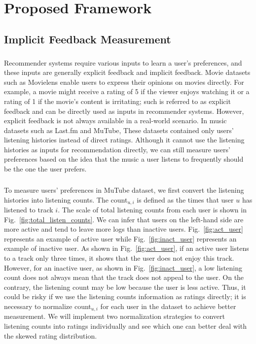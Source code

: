 \documentclass[a4paper,12pt]{report}
\begin{document}
\chapter{Proposed Framework}
\section{Implicit Feedback Measurement}
\label{section:Implicit Feedback Measurment}
\paragraph{}
Recommender systems require various inputs to learn a user's preferences, and these inputs are generally explicit feedback and implicit feedback. Movie datasets such as Movielens\cite{harper2015movielens} enable users to express their opinions on movies directly. For example, a movie might receive a rating of 5 if the viewer enjoys watching it or a rating of 1 if the movie's content is irritating; such is referred to as explicit feedback and can be directly used as inputs in recommender systems. However, explicit feedback is not always available in a real-world scenario. In music datasets such as Last.fm\cite{Bertin-Mahieux2011,vigliensoni17music} and MuTube\cite{MuTube2020ICS}, These datasets contained only users' listening histories instead of direct ratings. Although it cannot use the listening histories as inputs for recommendation directly, we can still measure users' preferences based on the idea that the music a user listens to frequently should be the one the user prefers.
\paragraph{}
To measure users' preferences in MuTube dataset, we first convert the listening histories into listening counts. The count$_{u,i}$ is defined as the times that user $u$ has listened to track $i$. The scale of total listening counts from each user is shown in Fig.~\ref{fig:total_listen_counts}. We can infer that users on the left-hand side are more active and tend to leave more logs than inactive users. Fig.~\ref{fig:act_user} represents an example of active user while Fig.~\ref{fig:inact_user} represents an example of inactive user. As shown in Fig.~\ref{fig:act_user},   if an active user listens to a track only three times, it shows that the user does not enjoy this track. However, for an inactive user, as shown in Fig.~\ref{fig:inact_user}, a low listening count does not always mean that the track does not appeal to the user. On the contrary, the listening count may be low because the user is less active. Thus, it could be risky if we use the listening counts information as ratings directly; it is necessary to normalize count$_{u,i}$ for each user in the dataset to achieve better measurement. We will implement two normalization strategies to convert listening counts into ratings individually and see which one can better deal with the skewed rating distribution.
\end{document}
